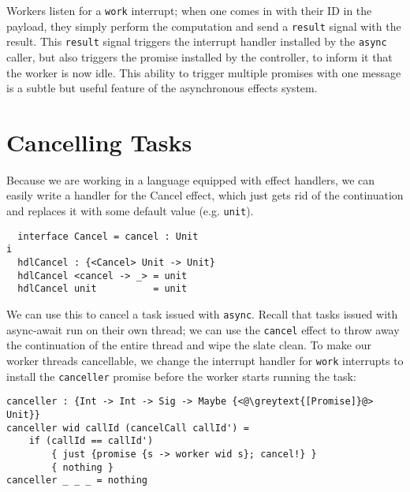 \documentclass[msc,deptreport,cs]{infthesis} %
\newcommand{\code}[1]{\lstinline{#1}}
\newcommand{\greytext}[1]{\textcolor{black!40}{#1}}
\begin{document}
Workers listen for a \code{work} interrupt; when one comes in with their ID in
the payload, they simply perform the computation and send a \code{result} signal
with the result. This \code{result} signal triggers the interrupt handler
installed by the \code{async} caller, but also triggers the promise installed by
the controller, to inform it that the worker is now idle. This ability to
trigger multiple promises with one message is a subtle but useful feature of the
asynchronous effects system.

\section{Cancelling Tasks}

Because we are working in a language equipped with effect handlers, we can
easily write a handler for the \textsf{Cancel} effect, which just gets rid of
the continuation and replaces it with some default value (e.g. \code{unit}).

\begin{lstlisting}
  interface Cancel = cancel : Unit
i
  hdlCancel : {<Cancel> Unit -> Unit}
  hdlCancel <cancel -> _> = unit
  hdlCancel unit          = unit
\end{lstlisting}

\noindent We can use this to cancel a task issued with \code{async}. Recall that
tasks issued with async-await run on their own thread; we can use the
\code{cancel} effect to throw away the continuation of the entire thread and
wipe the slate clean. To make our worker threads cancellable, we change the
interrupt handler for \code{work} interrupts to install the \code{canceller}
promise before the worker starts running the task:


\begin{lstlisting}
canceller : {Int -> Int -> Sig -> Maybe {<@\greytext{[Promise]}@> Unit}}
canceller wid callId (cancelCall callId') =
    if (callId == callId')
        { just {promise {s -> worker wid s}; cancel!} }
        { nothing }
canceller _ _ _ = nothing
\end{lstlisting}
\end{document}
